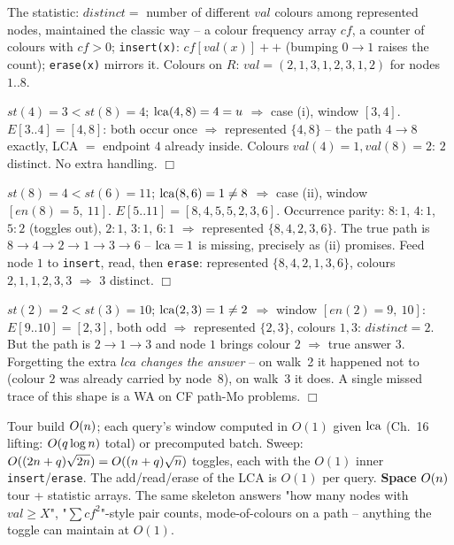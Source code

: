 The statistic: \(\mathit{distinct}=\) number of different \(\mathit{val}\)
colours among represented nodes, maintained the classic way -- a colour
frequency array \(\mathit{cf}\), a counter of colours with \(\mathit{cf}>0\);
\texttt{insert(x)}: \(\mathit{cf}[\mathit{val}(x)]{+}{+}\) (bumping \(0\to1\)
raises the count); \texttt{erase(x)} mirrors it.  Colours on \(R\):
\(\mathit{val}=(2,1,3,1,2,3,1,2)\) for nodes \(1..8\).

\begin{tracebox}
\(st(4)=3 < st(8)=4\); \(\operatorname{lca}(4,8)=4=u\) \(\Rightarrow\) case (i), window
\([3,4]\).  \(E[3..4]=[4,8]\): both occur once \(\Rightarrow\) represented
\(\{4,8\}\) -- the path \(4\to8\) exactly, LCA \(=\) endpoint \(4\) already
inside.  Colours \(\mathit{val}(4)=1,\mathit{val}(8)=2\): \(\boxed{2}\)
distinct.  No extra handling. \(\Box\)
\end{tracebox}

\begin{tracebox}
\(st(8)=4 < st(6)=11\); \(\operatorname{lca}(8,6)=1\neq8\) \(\Rightarrow\) case (ii), window
\([en(8)=5,\ 11]\).  \(E[5..11]=[8,4,5,5,2,3,6]\).  Occurrence parity:
\(8{:}1\), \(4{:}1\), \(5{:}2\) (toggles out), \(2{:}1\), \(3{:}1\), \(6{:}1\)
\(\Rightarrow\) represented \(\{8,4,2,3,6\}\).  The true path is
\(8\to4\to2\to1\to3\to6\) -- \(\operatorname{lca}=1\) is missing, precisely as
(ii) promises.  Feed node \(1\) to \texttt{insert},
read, then \texttt{erase}: represented \(\{8,4,2,1,3,6\}\), colours
\(2,1,1,2,3,3\) \(\Rightarrow\) \(\boxed{3}\) distinct. \(\Box\)
\end{tracebox}

\begin{tracebox}
\(st(2)=2 < st(3)=10\); \(\operatorname{lca}(2,3)=1\neq2\) \(\Rightarrow\) window
\([en(2)=9,\ 10]\): \(E[9..10]=[2,3]\), both odd \(\Rightarrow\) represented
\(\{2,3\}\), colours \(1,3\): \(\mathit{distinct}=2\).  But the path is
\(2\to1\to3\) and node \(1\) brings colour \(2\) \(\Rightarrow\) true answer
\(\boxed{3}\).  Forgetting the extra \(\mathit{lca}\) \emph{changes the
answer} -- on walk~2 it happened not to (colour \(2\) was already carried by
node~8), on walk~3 it does.  A single missed trace of this shape is a WA on
CF path-Mo problems. \(\Box\)
\end{tracebox}

\begin{complexitybox}[Path Mo]
Tour build \(O(n)\); each query's window computed in \(O(1)\) given
\(\operatorname{lca}\) (Ch.~16 lifting: \(O(q\log n)\) total) or precomputed batch.
Sweep: \(O((2n+q)\sqrt{2n}) = O((n+q)\sqrt n)\) toggles, each with the
\(O(1)\) inner \texttt{insert}/\texttt{erase}.  The add/read/erase of the LCA
is \(O(1)\) per query. \textbf{Space} \(O(n)\) tour + statistic
arrays.  The same skeleton answers "how many nodes with \(\mathit{val}\ge X\)",
"\(\sum \mathit{cf}^2\)"-style pair counts, mode-of-colours on a path --
anything the toggle can maintain at \(O(1)\).
\end{complexitybox}

